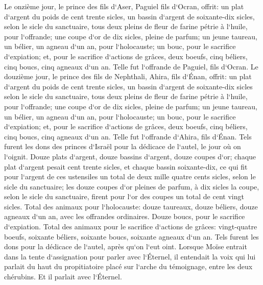 \verse Le onzième jour, le prince des fils d`Aser, Paguiel fils d`Ocran, 
\verse offrit: un plat d`argent du poids de cent trente sicles, un bassin d`argent de soixante-dix sicles, selon le sicle du sanctuaire, tous deux pleins de fleur de farine pétrie à l`huile, pour l`offrande; 
\verse une coupe d`or de dix sicles, pleine de parfum; 
\verse un jeune taureau, un bélier, un agneau d`un an, pour l`holocauste; 
\verse un bouc, pour le sacrifice d`expiation; 
\verse et, pour le sacrifice d`actions de grâces, deux boeufs, cinq béliers, cinq boucs, cinq agneaux d`un an. Telle fut l`offrande de Paguiel, fils d`Ocran. 
\verse Le douzième jour, le prince des fils de Nephthali, Ahira, fils d`Énan, 
\verse offrit: un plat d`argent du poids de cent trente sicles, un bassin d`argent de soixante-dix sicles selon le sicle du sanctuaire, tous deux pleins de fleur de farine pétrie à l`huile, pour l`offrande; 
\verse une coupe d`or de dix sicles, pleine de parfum; 
\verse un jeune taureau, un bélier, un agneau d`un an, pour l`holocauste; 
\verse un bouc, pour le sacrifice d`expiation; 
\verse et, pour le sacrifice d`actions de grâces, deux boeufs, cinq béliers, cinq boucs, cinq agneaux d`un an. Telle fut l`offrande d`Ahira, fils d`Énan. 
\verse Tels furent les dons des princes d`Israël pour la dédicace de l`autel, le jour où on l`oignit. Douze plats d`argent, douze bassins d`argent, douze coupes d`or; 
\verse chaque plat d`argent pesait cent trente sicles, et chaque bassin soixante-dix, ce qui fit pour l`argent de ces ustensiles un total de deux mille quatre cents sicles, selon le sicle du sanctuaire; 
\verse les douze coupes d`or pleines de parfum, à dix sicles la coupe, selon le sicle du sanctuaire, firent pour l`or des coupes un total de cent vingt sicles. 
\verse Total des animaux pour l`holocauste: douze taureaux, douze béliers, douze agneaux d`un an, avec les offrandes ordinaires. Douze boucs, pour le sacrifice d`expiation. 
\verse Total des animaux pour le sacrifice d`actions de grâces: vingt-quatre boeufs, soixante béliers, soixante boucs, soixante agneaux d`un an. Tels furent les dons pour la dédicace de l`autel, après qu`on l`eut oint. 
\verse Lorsque Moïse entrait dans la tente d`assignation pour parler avec l`Éternel, il entendait la voix qui lui parlait du haut du propitiatoire placé sur l`arche du témoignage, entre les deux chérubins. Et il parlait avec l`Éternel. 


